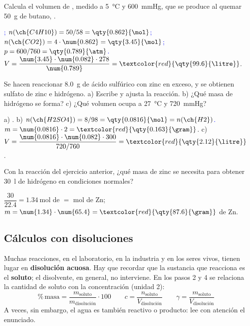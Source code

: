 \begin{exercise}
    Calcula el volumen de , medido a \qty{5}{\degreeCelsius} y \qty{600}{\mmHg}, que se produce al quemar \qty{50}{\gram}
    de butano, .
    \begin{solu}
        \textcolor{blue}{; \(n(\ch{C4H10}) = 50/58 = \qty{0.862}{\mol}\);
        \(n(\ch{CO2}) = 4 \cdot \num{0.862} = \qty{3.45}{\mol}\); \(p = 600/760 = \qty{0.789}{\atm}\).}
        \(V = \dfrac{\num{3.45} \cdot \num{0.082} \cdot 278}{\num{0.789}} = \textcolor{red}{\qty{99.6}{\litre}}\).
    \end{solu}
\end{exercise}

\begin{exercise}
    Se hacen reaccionar \qty{8.0}{\gram} de ácido sulfúrico con zinc en exceso, y se obtienen sulfato de zinc e hidrógeno.
    a) Escribe y ajusta la reacción. b) ¿Qué masa de hidrógeno se forma? c) ¿Qué volumen ocupa a \qty{27}{\degreeCelsius} y
    \qty{720}{\mmHg}?
    \begin{solu}
        a) \textcolor{red}{}. b) \textcolor{blue}{\(n(\ch{H2SO4}) = 8/98 = \qty{0.0816}{\mol} = n(\ch{H2})\).}
        \(m = \num{0.0816} \cdot 2 = \textcolor{red}{\qty{0.163}{\gram}}\). c) \(V = \dfrac{\num{0.0816} \cdot \num{0.082} \cdot 300}{720/760}
        = \textcolor{red}{\qty{2.12}{\litre}}\).
    \end{solu}
\end{exercise}

\begin{exercise}
    Con la reacción del ejercicio anterior, ¿qué masa de zinc se necesita para obtener \qty{30}{\litre} de hidrógeno en condiciones
    normales?
    \begin{solu}
        \(\dfrac{30}{\num{22.4}} = \qty{1.34}{\mol}\) de  \(=\) mol de Zn; \(m = \num{1.34} \cdot \num{65.4} =
        \textcolor{red}{\qty{87.6}{\gram}}\) de Zn.
    \end{solu}
\end{exercise}

\subsection{Cálculos con disoluciones}

Muchas reacciones, en el laboratorio, en la industria y en los seres vivos, tienen lugar en \textbf{disolución acuosa}. Hay que
recordar que la sustancia que reacciona es el \textbf{soluto}; el disolvente, en general, no interviene. En los pasos 2 y 4 se
relaciona la cantidad de soluto con la concentración (unidad 2):
\[ \%\,\text{masa} = \frac{m_{\text{soluto}}}{m_{\text{disolución}}} \cdot 100 \qquad
c = \frac{n_{\text{soluto}}}{V_{\text{disolución}}} \qquad \gamma = \frac{m_{\text{soluto}}}{V_{\text{disolución}}} \]
A veces, sin embargo, el agua es también reactivo o producto: lee con atención el enunciado.

